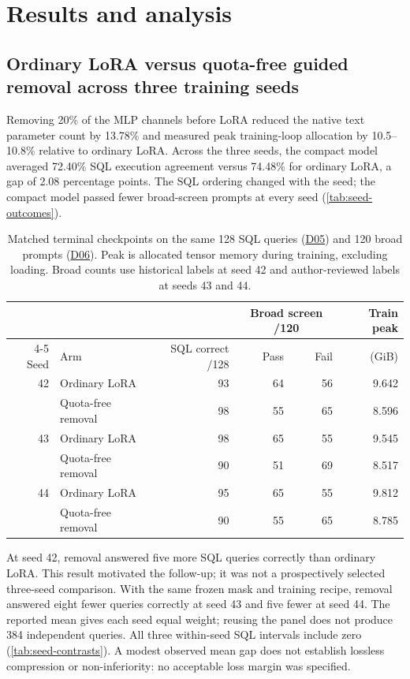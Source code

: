 \documentclass[10pt,letterpaper]{article}
\DeclareRobustCommand{\dataset}[1]{\hyperlink{dataset-#1}{\textnormal{#1}}}
\begin{document}
\section{Results and analysis}
\label{sec:results}

\subsection{Ordinary LoRA versus quota-free guided removal across three training seeds}
\label{sec:seed-replication}

Removing 20\% of the MLP channels before LoRA reduced the native text
parameter count by 13.78\% and measured peak training-loop allocation by
10.5--10.8\% relative to ordinary LoRA. Across the three seeds, the compact
model averaged 72.40\% SQL execution agreement versus 74.48\% for ordinary
LoRA, a gap of 2.08 percentage points. The SQL ordering changed with the
seed; the compact model passed fewer broad-screen prompts at every seed
(\autoref{tab:seed-outcomes}).

\begin{table}[!htbp]
\centering
\small
\caption{Matched terminal checkpoints on the same 128 SQL queries (\dataset{D05})
and 120 broad prompts (\dataset{D06}). Peak is allocated tensor memory during
training, excluding loading. Broad counts use historical labels at seed 42
and author-reviewed labels at seeds 43 and 44.}
\label{tab:seed-outcomes}
\begin{tabular}{@{}rlrrrr@{}}
\toprule
 & & & \multicolumn{2}{c}{Broad screen /120} & Train peak\\
\cmidrule(lr){4-5}
Seed & Arm & SQL correct /128 & Pass & Fail & (GiB)\\
\midrule
42 & Ordinary LoRA       & 93 & 64 & 56 & 9.642\\
   & Quota-free removal  & 98 & 55 & 65 & 8.596\\
43 & Ordinary LoRA       & 98 & 65 & 55 & 9.545\\
   & Quota-free removal  & 90 & 51 & 69 & 8.517\\
44 & Ordinary LoRA       & 95 & 65 & 55 & 9.812\\
   & Quota-free removal  & 90 & 55 & 65 & 8.785\\
\bottomrule
\end{tabular}
\end{table}

At seed 42, removal answered five more SQL queries correctly than ordinary
LoRA. This result motivated the follow-up; it was not a prospectively
selected three-seed comparison. With the same frozen mask and training
recipe, removal answered eight fewer queries correctly at seed 43 and five
fewer at seed 44. The reported mean gives each seed equal weight; reusing
the panel does not produce 384 independent queries. All three within-seed
SQL intervals include zero (\autoref{tab:seed-contrasts}). A modest observed
mean gap does not establish lossless compression or non-inferiority:
no acceptable loss margin was specified.
\end{document}
